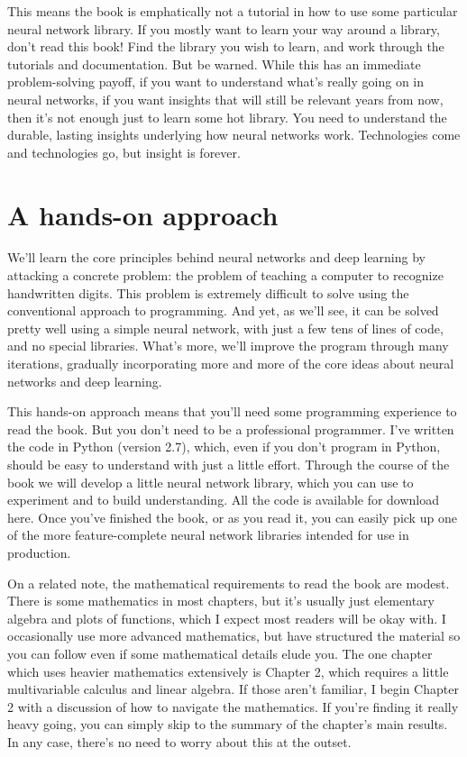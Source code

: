 \documentclass[a4paper,twoside,10pt]{book}
\begin{document}
This means the book is emphatically not a tutorial in how to use some particular neural network library. If you mostly want to learn your way around a library, don't read this book! Find the library you wish to learn, and work through the tutorials and documentation. But be warned. While this has an immediate problem-solving payoff, if you want to understand what's really going on in neural networks, if you want insights that will still be relevant years from now, then it's not enough just to learn some hot library. You need to understand the durable, lasting insights underlying how neural networks work. Technologies come and technologies go, but insight is forever.

\section*{A hands-on approach}
We'll learn the core principles behind neural networks and deep learning by attacking a concrete problem: the problem of teaching a computer to recognize handwritten digits. This problem is extremely difficult to solve using the conventional approach to programming. And yet, as we'll see, it can be solved pretty well using a simple neural network, with just a few tens of lines of code, and no special libraries. What's more, we'll improve the program through many iterations, gradually incorporating more and more of the core ideas about neural networks and deep learning.

This hands-on approach means that you'll need some programming experience to read the book. But you don't need to be a professional programmer. I've written the code in Python (version 2.7), which, even if you don't program in Python, should be easy to understand with just a little effort. Through the course of the book we will develop a little neural network library, which you can use to experiment and to build understanding. All the code is available for download here. Once you've finished the book, or as you read it, you can easily pick up one of the more feature-complete neural network libraries intended for use in production.

On a related note, the mathematical requirements to read the book are modest. There is some mathematics in most chapters, but it's usually just elementary algebra and plots of functions, which I expect most readers will be okay with. I occasionally use more advanced mathematics, but have structured the material so you can follow even if some mathematical details elude you. The one chapter which uses heavier mathematics extensively is Chapter 2, which requires a little multivariable calculus and linear algebra. If those aren't familiar, I begin Chapter 2 with a discussion of how to navigate the mathematics. If you're finding it really heavy going, you can simply skip to the summary of the chapter's main results. In any case, there's no need to worry about this at the outset.
\end{document}
